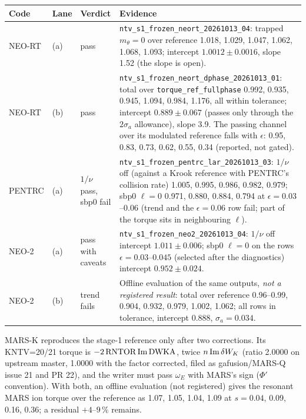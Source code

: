 \begin{center}\small
\begin{tabular}{p{15mm}p{8mm}p{18mm}p{102mm}}
\toprule
Code & Lane & Verdict & Evidence \\
\midrule
NEO-RT & (a) & pass & \texttt{ntv\_s1\_frozen\_neort\_20261013\_04}: trapped $m_\theta=0$ over reference 1.018, 1.029, 1.047,
1.062, 1.068, 1.093; intercept $1.0012\pm0.0016$, slope 1.52 (the slope is open). \\
NEO-RT & (b) & pass & \texttt{ntv\_s1\_frozen\_neort\_dphase\_20261013\_01}: total over \texttt{torque\_ref\_fullphase} 0.992, 0.935,
0.945, 1.094, 0.984, 1.176, all within tolerance; intercept $0.889\pm0.067$ (passes only through the $2\sigma_a$
allowance), slope 3.9. The passing channel over its modulated reference falls with $\epsilon$:
0.95, 0.83, 0.73, 0.62, 0.55, 0.34 (reported, not gated). \\
PENTRC & (a) & $1/\nu$ pass, sbp0 fail & \texttt{ntv\_s1\_frozen\_pentrc\_lar\_20261013\_03}: $1/\nu$ off (against a Krook reference with PENTRC's
collision rate) 1.005, 0.995, 0.986, 0.982, 0.979; sbp0 $\ell=0$ 0.971, 0.880, 0.884, 0.794 at $\epsilon=0.03$--$0.06$
(trend and the $\epsilon=0.06$ row fail; part of the torque sits in neighbouring $\ell$). \\
NEO-2 & (a) & pass with caveats & \texttt{ntv\_s1\_frozen\_neo2\_20261013\_04}: $1/\nu$ off intercept $1.011\pm0.006$; sbp0 $\ell=0$ on
the rows $\epsilon=0.03$--$0.045$ (selected after the diagnostics) intercept $0.952\pm0.024$. \\
NEO-2 & (b) & trend fails & Offline evaluation of the same outputs, \emph{not a registered result}: total over reference 0.96--0.99,
0.904, 0.932, 0.979, 1.002, 1.062; all rows in tolerance, intercept 0.888, $\sigma_a=0.034$. \\
\bottomrule
\end{tabular}
\end{center}

MARS-K reproduces the stage-1 reference only after two corrections. Its KNTV=20/21 torque is
$-2\,{\rm RNTOR}\,{\rm Im}\,{\rm DWKA}$, twice $n\,{\rm Im}\,\delta W_K$ (ratio 2.0000 on upstream master, 1.0000
with the factor corrected, filed as gafusion/MARS-Q issue 21 and PR 22), and the writer must pass
$\omega_E$ with MARS's sign ($\Phi'$ convention). With both, an offline evaluation (not registered) gives the
resonant MARS ion torque over the reference as 1.07, 1.05, 1.04, 1.09 at $s=0.04$, 0.09, 0.16, 0.36; a residual
$+4$--$9\,\%$ remains.

